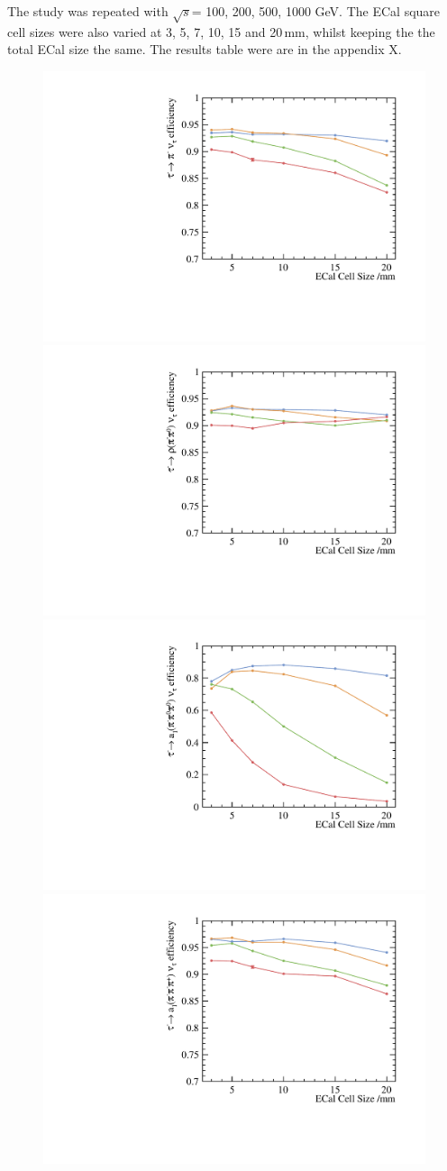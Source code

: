 \documentclass[a4paper,11pt]{article}
\newcommand{\rootS}{\ensuremath{\sqrt{s}}}
\begin{document}


The study was repeated with  \rootS = 100, 200, 500, 1000 GeV. The ECal square cell sizes were also varied at 3, 5, 7, 10, 15 and 20\,mm, whilst keeping the the total ECal size the same. The results table were are in the appendix X. 

\begin{figure}[htbp]
\centering %
\includegraphics[width=.45\textwidth]{plots/decayMode2}
\qquad
\includegraphics[width=.45\textwidth]{plots/decayMode3} 
\qquad
\includegraphics[width=.45\textwidth]{plots/decayMode4} 
\qquad
\includegraphics[width=.45\textwidth]{plots/decayMode5}

\end{figure}
\end{document}
